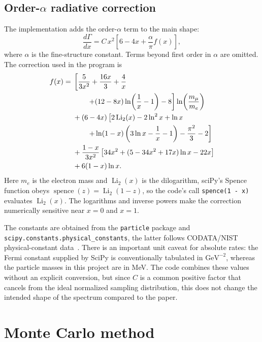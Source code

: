 \documentclass[conference]{IEEEtran}
\begin{document}
\subsection{Order-\texorpdfstring{$\alpha$}{alpha} radiative correction}

The implementation adds the order-$\alpha$ term to the main shape:
\begin{equation}
    \frac{d\Gamma}{dx}
    = C\,x^2\left[6-4x+\frac{\alpha}{\pi}f(x)\right],
    \label{eq:corrected-spectrum}
\end{equation}
where $\alpha$ is the fine-structure constant. Terms beyond first order in $\alpha$ are omitted. The correction used in the program is
\begin{align}
 f(x)={}&\left[\frac{5}{3x^2}+\frac{16x}{3}+\frac{4}{x}\right.\notag\\
 &\qquad\left.+(12-8x)\ln\!\left(\frac{1}{x}-1\right)-8\right]
 \ln\!\left(\frac{m_\mu}{m_e}\right) \notag\\
 &+(6-4x)\left[2\operatorname{Li}_2(x)-2\ln^2x+\ln x\right.\notag\\
 &\qquad\left.+\ln(1-x)\left(3\ln x-\frac{1}{x}-1\right)
 -\frac{\pi^2}{3}-2\right] \notag\\
 &+\frac{1-x}{3x^2}\left[34x^2+(5-34x^2+17x)\ln x-22x\right]\notag\\
 &+6(1-x)\ln x.
 \label{eq:fx}
\end{align}
Here $m_e$ is the electron mass and $\operatorname{Li}_2(x)$ is the dilogarithm, sciPy's Spence function obeys $\operatorname{spence}(z)=\operatorname{Li}_2(1-z)$, so the code's call \texttt{spence(1 - x)} evaluates $\operatorname{Li}_2(x)$. The logarithms and inverse powers make the correction numerically sensitive near $x=0$ and $x=1$.

The constants are obtained from the \texttt{particle} package and \texttt{scipy.constants.physical\_constants}, the latter follows CODATA/NIST physical-constant data~\cite{nist_constants}. There is an important unit caveat for absolute rates: the Fermi constant supplied by SciPy is conventionally tabulated in $\mathrm{GeV}^{-2}$, whereas the particle masses in this project are in MeV. The code combines these values without an explicit conversion, but since $C$ is a common positive factor that cancels from the ideal normalized sampling distribution, this does not change the intended shape of the spectrum compared to the paper.

\section{Monte Carlo method}
\end{document}
